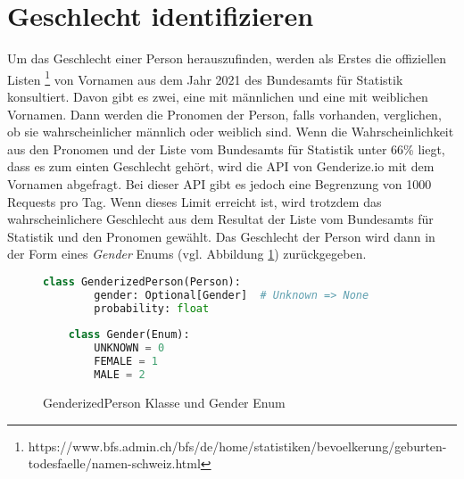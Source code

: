 \section{Geschlecht identifizieren}\label{identify-gender}


Um das Geschlecht einer Person herauszufinden, werden als Erstes die offiziellen Listen 
\footnote{https://www.bfs.admin.ch/bfs/de/home/statistiken/bevoelkerung/geburten-todesfaelle/namen-schweiz.html} 
von Vornamen aus dem Jahr 2021 des Bundesamts für Statistik konsultiert. 
Davon gibt es zwei, eine mit männlichen und eine mit weiblichen Vornamen.
Dann werden die Pronomen der Person, falls vorhanden, verglichen, ob sie wahrscheinlicher männlich oder weiblich sind.
Wenn die Wahrscheinlichkeit aus den Pronomen und der Liste vom Bundesamts für Statistik unter 66\% liegt, dass es zum einten Geschlecht gehört,
wird die API von Genderize.io mit dem Vornamen abgefragt. Bei dieser API gibt es jedoch eine Begrenzung von 1000 Requests pro Tag.
Wenn dieses Limit erreicht ist, wird trotzdem das wahrscheinlichere Geschlecht aus dem Resultat der Liste vom Bundesamts für Statistik und den Pronomen gewählt.
Das Geschlecht der Person wird dann in der Form eines \textsl{Gender} Enums (vgl. Abbildung \ref{genderized-person-class}) zurückgegeben.

\begin{figure}[H]
	\begin{lstlisting}[language=Python]
    class GenderizedPerson(Person):
        gender: Optional[Gender]  # Unknown => None
        probability: float
    
    class Gender(Enum):
        UNKNOWN = 0
        FEMALE = 1
        MALE = 2        
	\end{lstlisting}
	\caption{GenderizedPerson Klasse und Gender Enum}
	\label{genderized-person-class}
\end{figure}
